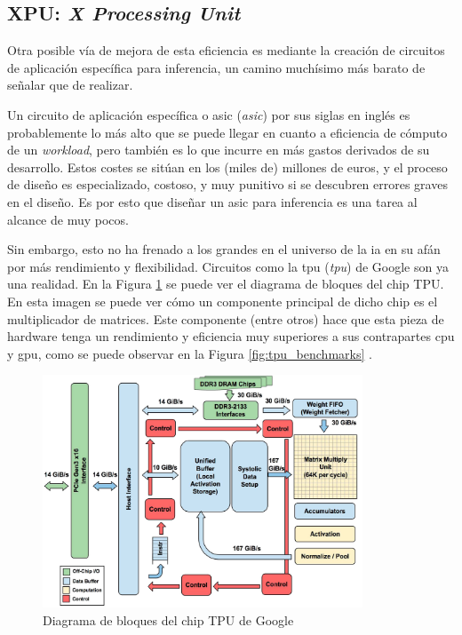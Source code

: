 \subsection{XPU: \textit{X Processing Unit}}
\label{ssec:xpu}
Otra posible vía de mejora de esta eficiencia es mediante la creación de circuitos de aplicación específica para inferencia, un camino muchísimo más barato de señalar que de realizar.

Un circuito de aplicación específica o \acrshort{asic} (\textit{\acrlong{asic}}) por sus siglas en inglés es probablemente lo más alto que se puede llegar en cuanto a eficiencia de cómputo de un \textit{workload}, pero también es lo que incurre en más gastos derivados de su desarrollo. Estos costes se sitúan en los (miles de) millones de euros, y el proceso de diseño es especializado, costoso, y muy punitivo si se descubren errores graves en el diseño. Es por esto que diseñar un \acrshort{asic} para inferencia es una tarea al alcance de muy pocos.


Sin embargo, esto no ha frenado a los grandes en el universo de la \acrshort{ia} en su afán por más rendimiento y flexibilidad. Circuitos como la \acrshort{tpu} (\textit{\acrlong{tpu}}) de Google son ya una realidad. En la Figura \ref{fig:tpu_block_diagram} \cite{jouppi2017_in_datacenter_tpu} se puede ver el diagrama de bloques del chip TPU. En esta imagen se puede ver cómo un componente principal de dicho chip es el multiplicador de matrices. Este componente (entre otros) hace que esta pieza de hardware tenga un rendimiento y eficiencia muy superiores a sus contrapartes \acrshort{cpu} y \acrshort{gpu}, como se puede observar en la Figura \ref{fig:tpu_benchmarks} \cite{devopedia_tpu}.

\begin{figure}[h!]
    \centering
    \includegraphics[width=0.85\textwidth]{img/tpu_block_diagram.jpg}
    \caption{Diagrama de bloques del chip TPU de Google}
    \label{fig:tpu_block_diagram}
\end{figure}

